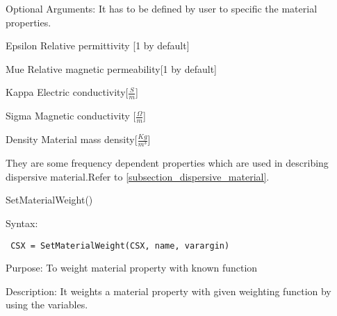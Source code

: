  \begin{FontDescr}{Optional Arguments:}
  It has to be defined by user to specific the material properties. 
   \begin{FontPara}{Epsilon} Relative permittivity [1 by default]\end{FontPara}

  \begin{FontPara}{Mue} Relative magnetic permeability[1 by default]\end{FontPara}

  \begin{FontPara}{Kappa} Electric conductivity[$\frac{S}{m}$]\end{FontPara}

   \begin{FontPara}{Sigma} Magnetic conductivity [$\frac{\Omega}{m}$]\end{FontPara}

  \begin{FontPara}{Density} Material mass density[$\frac{Kg}{m^{3}}$] \end{FontPara}

   They are some frequency dependent properties which are used in describing dispersive material.Refer to \ref{subsection_dispersive_material}. 
  
 \end{FontDescr}


\begin{FontNameFunct}{SetMaterialWeight()}
\end{FontNameFunct}

\begin{FontDescr}{Syntax:}
  \begin{lstlisting}
 CSX = SetMaterialWeight(CSX, name, varargin)
  \end{lstlisting}
\end{FontDescr}  

\begin{FontDescr}{Purpose:}
To weight material property with known function
\end{FontDescr}

\begin{FontDescr}{Description:}
It weights a material property with given weighting function by using the variables.
\end{FontDescr}


